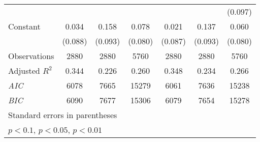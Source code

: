 {\begin{tabular}{l*{6}{c}}
                    &                     &                     &                     &                     &                     &     (0.097)         \\
[1em]
Constant            &       0.034         &       0.158\sym{*}  &       0.078         &       0.021         &       0.137         &       0.060         \\
                    &     (0.088)         &     (0.093)         &     (0.080)         &     (0.087)         &     (0.093)         &     (0.080)         \\
\hline
Observations        &        2880         &        2880         &        5760         &        2880         &        2880         &        5760         \\
Adjusted \(R^{2}\)  &       0.344         &       0.226         &       0.260         &       0.348         &       0.234         &       0.266         \\
\textit{AIC}        &        6078         &        7665         &       15279         &        6061         &        7636         &       15238         \\
\textit{BIC}        &        6090         &        7677         &       15306         &        6079         &        7654         &       15278         \\
\hline\hline
\multicolumn{7}{l}{\footnotesize Standard errors in parentheses}\\
\multicolumn{7}{l}{\footnotesize \sym{*} \(p<0.1\), \sym{**} \(p<0.05\), \sym{***} \(p<0.01\)}\\
\end{tabular}
}
